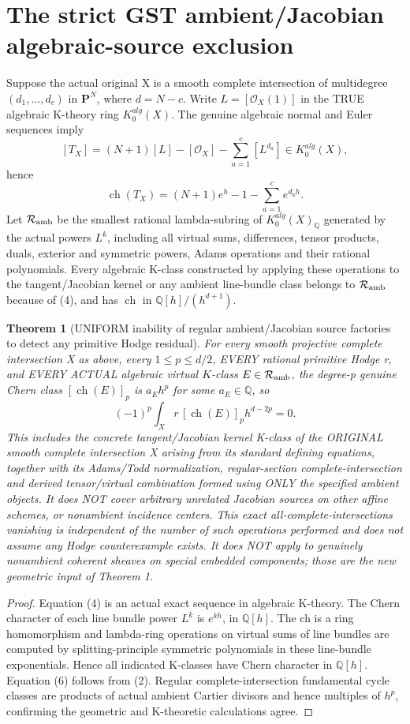 \documentclass[11pt]{article}
\newcommand{\Q}{\mathbb Q}
\newcommand{\OO}{\mathcal O}
\newtheorem{theorem}{Theorem}
\begin{document}
\section{The strict GST ambient/Jacobian algebraic-source exclusion}
Suppose the actual original X is a smooth complete intersection
of multidegree \((d_1,\ldots,d_c)\) in \(\mathbf P^N\),
where \(d=N-c\). Write \(L=[\OO_X(1)]\) in the
TRUE algebraic K-theory ring \(K_0^{alg}(X)\).
The genuine algebraic normal and Euler sequences imply
\[
 \boxed{[T_X]=(N+1)[L]-[\OO_X]-\sum_{a=1}^{c}[L^{d_a}]
                \in K_0^{alg}(X),}                \tag{4}
\]
hence
\[
 \boxed{\operatorname{ch}(T_X)
          =(N+1)e^h-1-\sum_{a=1}^{c}e^{d_a h}.}   \tag{5}
\]
Let \(\mathcal R_{\rm amb}\) be the smallest rational
lambda-subring of \(K_0^{alg}(X)_\Q\) generated by the
actual powers \(L^k\), including all virtual sums,
differences, tensor products, duals, exterior and
symmetric powers, Adams operations and their rational
polynomials. Every algebraic K-class constructed by
applying these operations to the tangent/Jacobian
kernel or any ambient line-bundle class belongs to
\(\mathcal R_{\rm amb}\) because of (4), and has
\(\operatorname{ch}\) in \(\Q[h]/(h^{d+1})\).

\begin{theorem}[UNIFORM inability of regular ambient/Jacobian source factories to detect any primitive Hodge residual]
For every smooth projective complete intersection X as above,
every \(1\le p\le d/2\), EVERY rational primitive Hodge r,
and EVERY ACTUAL algebraic virtual \(K\)-class
\(E\in\mathcal R_{\rm amb}\),
the degree-p genuine Chern class
\([\operatorname{ch}(E)]_p\) is \(a_Eh^p\)
for some \(a_E\in\Q\), so
\[
 \boxed{(-1)^p\int_Xr\, [\operatorname{ch}(E)]_p
                         h^{d-2p}=0.}            \tag{6}
\]
This includes the concrete tangent/Jacobian kernel K-class
of the ORIGINAL smooth complete intersection X arising
from its standard defining equations, together with its
Adams/Todd normalization, regular-section
complete-intersection and derived tensor/virtual combination
formed using ONLY the specified ambient objects.
It does NOT cover arbitrary unrelated Jacobian sources on
other affine schemes, or nonambient incidence centers.
This exact all-complete-intersections vanishing is independent
of the number of such operations performed and does not
assume any Hodge counterexample exists.
It does NOT apply to genuinely nonambient coherent sheaves
on special embedded components; those are the new geometric
input of Theorem 1.
\end{theorem}
\begin{proof}
Equation (4) is an actual exact sequence in algebraic K-theory.
The Chern character of each line bundle power \(L^k\)
is \(e^{kh}\), in \(\Q[h]\).
The ch is a ring homomorphism and
lambda-ring operations on virtual sums of line bundles
are computed by splitting-principle symmetric polynomials
in these line-bundle exponentials. Hence all indicated
K-classes have Chern character in \(\Q[h]\).
Equation (6) follows from (2).
Regular complete-intersection fundamental cycle
classes are products of actual ambient Cartier
divisors and hence multiples of \(h^p\), confirming
the geometric and K-theoretic calculations agree.
\end{proof}
\end{document}
